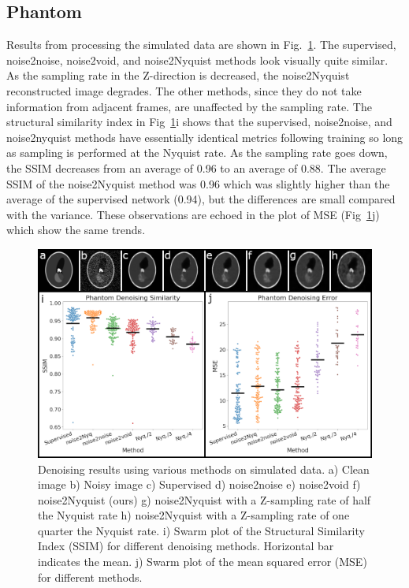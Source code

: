 \documentclass[journal,twoside,web]{ieeecolor}
\begin{document}
\subsection{Phantom}
Results from processing the simulated data are shown in Fig.~\ref{fig:phantomResults}. The supervised, noise2noise, noise2void, and noise2Nyquist methods look visually quite similar. As the sampling rate in the Z-direction is decreased, the noise2Nyquist reconstructed image degrades. The other methods, since they do not take information from adjacent frames, are unaffected by the sampling rate. The structural similarity index in Fig~\ref{fig:phantomResults}i shows that the supervised, noise2noise, and noise2nyquist methods have essentially identical metrics following training so long as sampling is performed at the Nyquist rate. As the sampling rate goes down, the SSIM decreases from an average of 0.96 to an average of 0.88. The average SSIM of the noise2Nyquist method was 0.96 which was slightly higher than the average of the supervised network (0.94), but the differences are small compared with the variance. These observations are echoed in the plot of MSE (Fig~\ref{fig:phantomResults}j) which show the same trends.
\begin{figure}[htb]
	\begin{center}
		\includegraphics[width=.8\textwidth]{phantom/phantomResults_Horiz}
		\caption{\label{fig:phantomResults}Denoising results using various methods on simulated data. a) Clean image b) Noisy image c) Supervised d) noise2noise e) noise2void f) noise2Nyquist (ours) g) noise2Nyquist with a Z-sampling rate of half the Nyquist rate h) noise2Nyquist with a Z-sampling rate of one quarter the Nyquist rate. i) Swarm plot of the Structural Similarity Index (SSIM) for different denoising methods. Horizontal bar indicates the mean. j) Swarm plot of the mean squared error (MSE) for different methods.}
	\end{center}
\end{figure}
\end{document}

